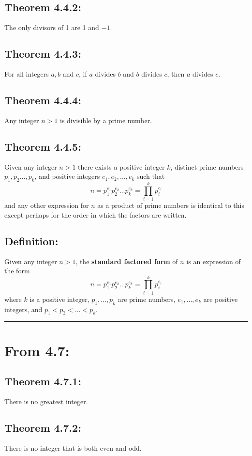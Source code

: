 \documentclass[11pt]{article}
\begin{document}
\subsection*{Theorem 4.4.2:}
The only divisors of 1 are 1 and $-1$. 

\subsection*{Theorem 4.4.3:}
For all integers $a,b$ and $c$, if $a$ divides $b$ and $b$ 
divides $c$, then $a$ divides $c$. 

\subsection*{Theorem 4.4.4:}
Any integer $n > 1$ is divisible by a prime number. 

\subsection*{Theorem 4.4.5:}
Given any integer $n > 1$ there exists a positive integer 
$k$, distinct prime numbers $p_1,p_2 \dots, p_k$, 
and positive integers $e_1,e_2, \dots, e_k$ such that
$$
n = p_1^{e_1} p_2^{e_2} \dots p_k^{e_k} = \prod_{i = 1}^k p_i^{e_i}
$$
and any other expression for $n$ as a product of prime numbers 
is identical to this except perhaps for the order in which 
the factors are written. 

\subsection*{Definition:}
Given any integer $n> 1$, the {\bf standard factored form} 
of $n$ is an expression of the form
$$
n = p_1^{e_1} p_2^{e_2} \dots p_k^{e_k} = \prod_{i = 1}^k p_i^{e_i}
$$
where $k$ is a positive integer, $p_1, \dots, p_k$ are 
prime numbers, $e_1, \dots, e_k$ are positive integers, 
and $p_1 < p_2 < \dots < p_k$. 

\bigskip
\hrule
\bigskip

\section*{From 4.7:}

\subsection*{Theorem 4.7.1:}
There is no greatest integer.

\subsection*{Theorem 4.7.2:}
There is no integer that is both even and odd.
\end{document}
